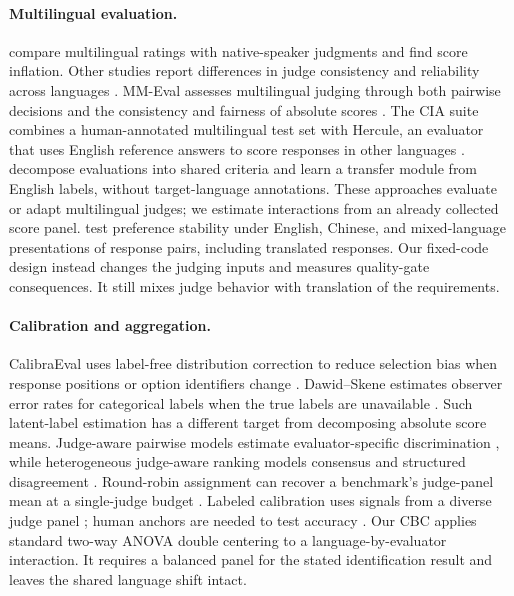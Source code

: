 \documentclass[sigconf,anonymous]{aamas}
\begin{document}
\paragraph{Multilingual evaluation.}
\citet{hada-etal-2024-large} compare multilingual ratings with native-speaker
judgments and find score inflation. Other studies report differences in
judge consistency and reliability across languages \citep{fu2025reliable,babeljudge2026}.
MM-Eval assesses multilingual judging through both pairwise decisions and
the consistency and fairness of absolute scores \citep{son2024mmeval}.
The CIA suite combines a human-annotated multilingual test set with Hercule,
an evaluator that uses English reference answers to score responses in
other languages \citep{doddapaneni2025cross}.
\citet{sheth2026crosslingual} decompose evaluations into shared criteria
and learn a transfer module from English labels, without target-language
annotations. These approaches evaluate or adapt multilingual judges;
we estimate interactions from an already collected score panel.
\citet{yin2026judgels} test preference stability under English, Chinese,
and mixed-language presentations of response pairs, including translated
responses. Our fixed-code design instead changes the judging inputs and
measures quality-gate consequences. It still mixes judge behavior with
translation of the requirements.

\paragraph{Calibration and aggregation.}
CalibraEval uses label-free distribution correction to reduce selection
bias when response positions or option identifiers change
\citep{li2025calibraeval}. Dawid--Skene estimates observer error rates for
categorical labels when the true labels are unavailable
\citep{dawid1979maximum}. Such latent-label estimation has a different
target from decomposing absolute score means.
Judge-aware pairwise models estimate evaluator-specific discrimination
\citep{xu2026judgeaware}, while heterogeneous judge-aware ranking models
consensus and structured disagreement \citep{yu2026heterogeneous}.
Round-robin assignment can recover a benchmark's judge-panel mean at a
single-judge budget \citep{zhu2026cyclicjudge}.
Labeled calibration uses signals from a diverse judge panel
\citep{li2026calibrate}; human anchors are needed to test accuracy
\citep{lee2026report}. Our CBC applies standard two-way ANOVA double
centering \citep{scheffe1959analysis,searle1971linear} to a
language-by-evaluator interaction. It requires a balanced panel for the
stated identification result and leaves the shared language shift intact.
\end{document}
